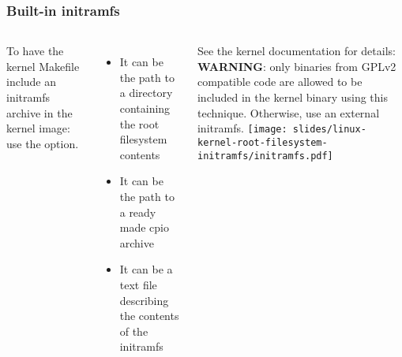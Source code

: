 \begin{frame}
  \frametitle{Built-in initramfs}
  \begin{columns}
  To have the kernel Makefile include an initramfs archive in
  the kernel image: use the 
  option.
  \begin{itemize}
  \item It can be the path to a directory containing the root
    filesystem contents
  \item It can be the path to a ready made cpio archive
  \item It can be a text file describing the contents of the initramfs
  \end{itemize}
  See the kernel documentation for details:
  \vspace{0.5cm}\\
  {\bf WARNING}: only binaries from GPLv2 compatible code are allowed to be
  included in the kernel binary using this technique. Otherwise, use
  an external initramfs.
    \texttt{[image: slides/linux-kernel-root-filesystem-initramfs/initramfs.pdf]}
  \end{columns}
\end{frame}
